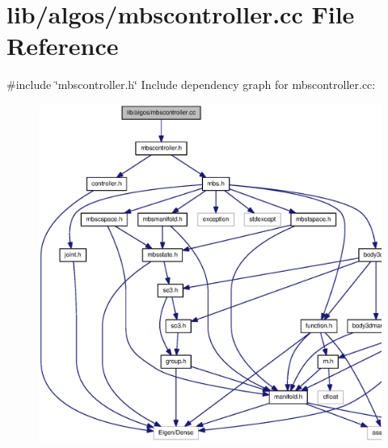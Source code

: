 \section{lib/algos/mbscontroller.cc \-File \-Reference}
\label{mbscontroller_8cc}
{\ttfamily \#include \char`\"{}mbscontroller.\-h\char`\"{}}\*
\-Include dependency graph for mbscontroller.\-cc\-:
\nopagebreak
\begin{figure}[H]
\begin{center}
\leavevmode
\includegraphics[width=350pt]{mbscontroller_8cc__incl}
\end{center}
\end{figure}
